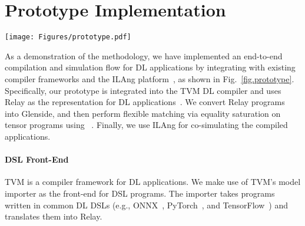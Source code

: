 \section{\TLA Prototype Implementation}
\label{sec.prototype}

\begin{figure*}
  \centering
  \texttt{[image: Figures/prototype.pdf]}
  \caption{
  \textbf{Prototype implementation of the {\TLA} flow.}
  The green boxes represent additional inputs needed for the \TLA flow. The blue boxes represent the mostly automated capabilities added by the flow. The ILA specification model can also be used to formally verify the accelerator RTL implementation (as demonstrated in prior work~\cite{huang2018instruction}). The compiler IR rewrite rules and \mapping %
  rules can support other 
  compiler optimization and verification tasks.
  }
  \label{fig.prototype}
\Description{}
\end{figure*}


As a demonstration of the {\TLA} methodology, we have implemented an end-to-end compilation and simulation flow for DL applications by integrating with existing compiler frameworks and the ILAng platform~\cite{huang2019ilang}, as shown in Fig.~\ref{fig.prototype}.
Specifically, 
  our prototype is integrated into the TVM DL compiler and uses Relay
  as the representation for DL applications~\cite{chen2018tvm, roesch2019relay}.
We convert Relay programs into Glenside, and then perform flexible matching via equality saturation on tensor programs using \egg~\cite{smith2021pure,willsey2021egg}.
Finally, we use ILAng for co-simulating the compiled applications.

%

% 

\paragraph{DSL Front-End}
TVM is a compiler framework for DL applications. %
%
We make use of TVM's model importer as the front-end for DSL programs.
%
The importer takes programs written in common DL DSLs
(e.g., ONNX~\cite{linux2019onnx}, PyTorch~\cite{paszke2019pytorch}, and TensorFlow~\cite{abadi2016tensorflow}) and translates them into Relay.

